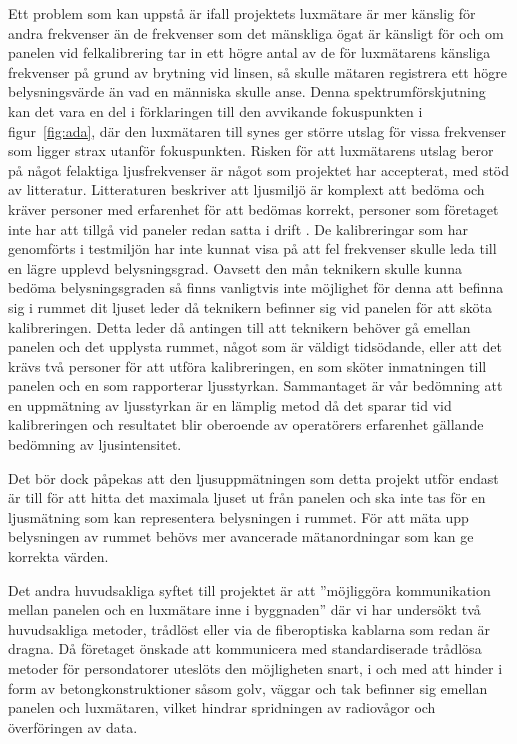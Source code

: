         Ett problem som kan uppstå är ifall projektets luxmätare är mer känslig för andra frekvenser än de frekvenser som det mänskliga ögat är känsligt för och om panelen vid felkalibrering tar in ett högre antal av de för luxmätarens känsliga frekvenser på grund av brytning vid linsen, så skulle mätaren registrera ett högre belysningsvärde än vad en människa skulle anse. Denna spektrumförskjutning kan det vara en del i förklaringen till den avvikande fokuspunkten i figur~\ref{fig:ada}, där den luxmätaren till synes ger större utslag för vissa frekvenser som ligger strax utanför fokuspunkten. Risken för att luxmätarens utslag beror på något felaktiga ljusfrekvenser är något som projektet har accepterat, med stöd av litteratur. Litteraturen beskriver att ljusmiljö är komplext att bedöma och kräver personer med erfarenhet för att bedömas korrekt, personer som företaget inte har att tillgå vid paneler redan satta i drift \cite[s.~278]{aot}. De kalibreringar som har genomförts i testmiljön har inte kunnat visa på att fel frekvenser skulle leda till en lägre upplevd belysningsgrad. Oavsett den mån teknikern skulle kunna bedöma belysningsgraden så finns vanligtvis inte möjlighet för denna att befinna sig i rummet dit ljuset leder då teknikern befinner sig vid panelen för att sköta kalibreringen. Detta leder då antingen till att teknikern behöver gå emellan panelen och det upplysta rummet, något som är väldigt tidsödande, eller att det krävs två personer för att utföra kalibreringen, en som sköter inmatningen till panelen och en som rapporterar ljusstyrkan. Sammantaget är vår bedömning att en uppmätning av ljusstyrkan är en lämplig metod då det sparar tid vid kalibreringen och resultatet blir oberoende av operatörers erfarenhet gällande bedömning av ljusintensitet. \bigskip

        Det bör dock påpekas att den ljusuppmätningen som detta projekt utför endast är till för att hitta det maximala ljuset ut från panelen och ska inte tas för en ljusmätning som kan representera belysningen i rummet. För att mäta upp belysningen av rummet behövs mer avancerade mätanordningar som kan ge korrekta värden.\bigskip

        Det andra huvudsakliga syftet till projektet är att ''möjliggöra kommunikation mellan panelen och en luxmätare inne i byggnaden'' där vi har undersökt två huvudsakliga metoder, trådlöst eller via de fiberoptiska kablarna som redan är dragna. Då företaget önskade att kommunicera med standardiserade trådlösa metoder för persondatorer uteslöts den möjligheten snart, i och med att hinder i form av betongkonstruktioner såsom golv, väggar och tak befinner sig emellan panelen och luxmätaren, vilket hindrar spridningen av radiovågor och överföringen av data.\bigskip


